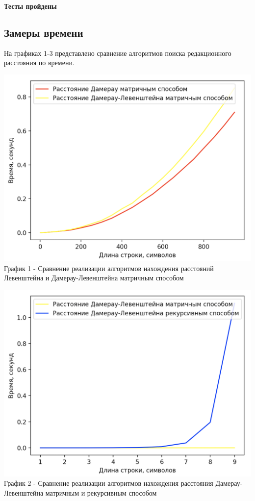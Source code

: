 \documentclass[a4paper,14pt]{article} %
\begin{document}
	\hfill
	
	\textbf{Тесты пройдены}

	\subsection{Замеры времени}
	
	\hfill
	
	На графиках 1-3 представлено сравнение алгоритмов поиска редакционного расстояния по времени. 
	
	\begin{center}
        		\includegraphics[scale = 0.5]{graph1} \\ График 1 - Сравнение реализации алгоритмов нахождения расстояний Левенштейна и Дамерау-Левенштейна матричным способом
	\end{center}
	
	\begin{center}
        		\includegraphics[scale = 0.5]{graph2} \\ График 2 - Сравнение реализации алгоритмов нахождения расстояния Дамерау-Левенштейна матричным и рекурсивным способом
	\end{center}
	
\end{document}
